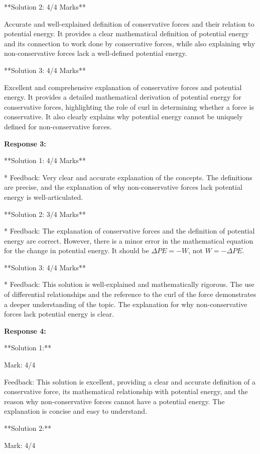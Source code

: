 \documentclass[a4paper,11pt]{article}
\begin{document}
**Solution 2: 4/4 Marks**

Accurate and well-explained definition of conservative forces and their relation to potential energy. It provides a clear mathematical definition of potential energy and its connection to work done by conservative forces, while also explaining why non-conservative forces lack a well-defined potential energy.

**Solution 3: 4/4 Marks**

Excellent and comprehensive explanation of conservative forces and potential energy. It provides a detailed mathematical derivation of potential energy for conservative forces, highlighting the role of curl in determining whether a force is conservative. It also clearly explains why potential energy cannot be uniquely defined for non-conservative forces.

\bigskip    
\textbf{Response 3:}

**Solution 1: 4/4 Marks**

*   Feedback: Very clear and accurate explanation of the concepts. The definitions are precise, and the explanation of why non-conservative forces lack potential energy is well-articulated.

**Solution 2: 3/4 Marks**

*   Feedback: The explanation of conservative forces and the definition of potential energy are correct. However, there is a minor error in the mathematical equation for the change in potential energy. It should be \( \Delta PE = -W \), not \( W = -\Delta PE \).

**Solution 3: 4/4 Marks**

*   Feedback: This solution is well-explained and mathematically rigorous. The use of differential relationships and the reference to the curl of the force demonstrates a deeper understanding of the topic. The explanation for why non-conservative forces lack potential energy is clear.

\bigskip    
\textbf{Response 4:}

**Solution 1:**

Mark: 4/4

Feedback: This solution is excellent, providing a clear and accurate definition of a conservative force, its mathematical relationship with potential energy, and the reason why non-conservative forces cannot have a potential energy. The explanation is concise and easy to understand.

**Solution 2:**

Mark: 4/4
\end{document}
